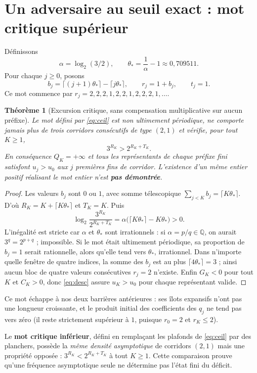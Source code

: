 \documentclass[11pt,a4paper]{article}
\newtheorem{theoreme}{Théorème}[section]
\begin{document}
\section{Un adversaire au seuil exact : mot critique supérieur}
Définissons
\[\alpha=\log_2(3/2),\qquad\theta_*=\frac1\alpha-1\approx0{,}709511.\]
Pour chaque $j\ge0$, posons
\begin{equation}\label{eq:ceil}
\boxed{b_j=\lceil(j+1)\theta_*\rceil-\lceil j\theta_*\rceil,\qquad r_j=1+b_j,\qquad t_j=1.}
\end{equation}
Ce mot commence par $r_j=2,2,2,1,2,2,1,2,2,2,1,\ldots$.
\begin{theoreme}[Excursion critique, sans compensation multiplicative sur aucun préfixe]
Le mot défini par \eqref{eq:ceil} est non ultimement périodique, ne comporte jamais plus de trois corridors consécutifs de type $(2,1)$ et vérifie, pour \emph{tout} $K\ge1$,
\begin{equation}\label{eq:crit}
\boxed{3^{R_K}>2^{R_K+T_K}.}
\end{equation}
En conséquence $Q_K=+\infty$ et tous les représentants de chaque préfixe fini satisfont $u_j>u_0$ aux $j$ premières fins de corridor. L'existence d'un \emph{même entier positif} réalisant le mot entier n'est \textbf{pas démontrée}.
\end{theoreme}
\begin{proof}
Les valeurs $b_j$ sont $0$ ou $1$, avec somme télescopique $\sum_{j<K}b_j=\lceil K\theta_*\rceil$. D'où $R_K=K+\lceil K\theta_*\rceil$ et $T_K=K$. Puis
\[
\log_2\frac{3^{R_K}}{2^{R_K+T_K}}=\alpha\bigl(\lceil K\theta_*\rceil-K\theta_*\bigr)>0.
\]
L'inégalité est stricte car $\alpha$ et $\theta_*$ sont irrationnels : si $\alpha=p/q\in\mathbb Q$, on aurait $3^q=2^{p+q}$ ; impossible. Si le mot était ultimement périodique, sa proportion de $b_j=1$ serait rationnelle, alors qu'elle tend vers $\theta_*$, irrationnel. Dans n'importe quelle fenêtre de quatre indices, la somme des $b_j$ est au plus $\lceil4\theta_*\rceil=3$ ; ainsi aucun bloc de quatre valeurs consécutives $r_j=2$ n'existe. Enfin $G_K<0$ pour tout $K$ et $C_K>0$, donc \eqref{eq:desc} assure $u_K>u_0$ pour chaque représentant valide.
\end{proof}
Ce mot échappe à nos deux barrières antérieures : ses îlots expansifs n'ont pas une longueur croissante, et le produit initial des coefficients des $q_j$ ne tend pas vers zéro (il reste strictement supérieur à $1$, puisque $r_0=2$ et $r_K\le2$).

Le \textbf{mot critique inférieur}, défini en remplaçant les plafonds de \eqref{eq:ceil} par des planchers, possède la \emph{même densité asymptotique} de corridors $(2,1)$ mais une propriété opposée : $3^{R_K}<2^{R_K+T_K}$ à tout $K\ge1$. Cette comparaison prouve qu'une fréquence asymptotique seule ne détermine pas l'état fini du déficit.
\end{document}
